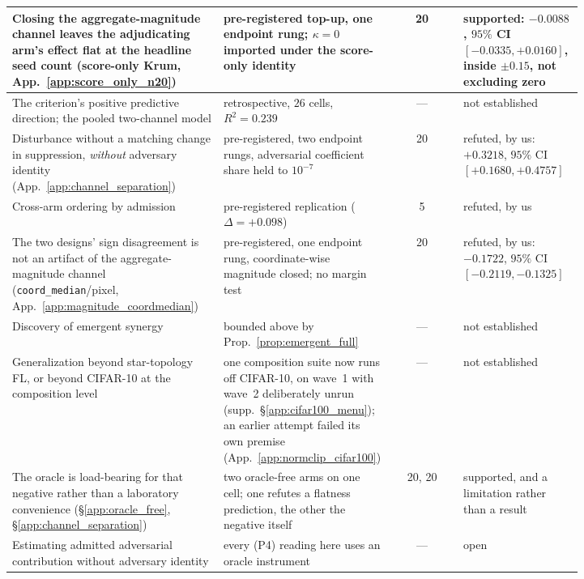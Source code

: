 \documentclass{article}
\begin{document}
\begin{table}[h]
\begin{tabular}{@{}p{0.375\linewidth}p{0.235\linewidth}cp{0.215\linewidth}@{}}
Closing the aggregate-magnitude channel leaves the adjudicating arm's effect flat at the headline seed count (score-only Krum, App.~\ref{app:score_only_n20}) & pre-registered top-up, one endpoint rung; $\kappa{=}0$ imported under the score-only identity & 20 & supported: $-0.0088$, $95\%$ CI $[-0.0335,+0.0160]$, inside $\pm0.15$, not excluding zero \\
\midrule
The criterion's positive predictive direction; the pooled two-channel model & retrospective, $26$ cells, $R^2{=}0.239$ & --- & not established \\
Disturbance without a matching change in suppression, \emph{without} adversary identity (App.~\ref{app:channel_separation}) & pre-registered, two endpoint rungs, adversarial coefficient share held to $10^{-7}$ & 20 & refuted, by us: $+0.3218$, $95\%$ CI $[+0.1680,+0.4757]$ \\
Cross-arm ordering by admission & pre-registered replication ($\Delta{=}{+}0.098$) & 5 & refuted, by us \\
The two designs' sign disagreement is not an artifact of the aggregate-magnitude channel (\texttt{coord\_median}/pixel, App.~\ref{app:magnitude_coordmedian}) & pre-registered, one endpoint rung, coordinate-wise magnitude closed; no margin test & 20 & refuted, by us: $-0.1722$, $95\%$ CI $[-0.2119,-0.1325]$ \\
Discovery of emergent synergy & bounded above by Prop.~\ref{prop:emergent_full} & --- & not established \\
Generalization beyond star-topology FL, or beyond CIFAR-10 at the composition level & one composition suite now runs off CIFAR-10, on wave~1 with wave~2 deliberately unrun (supp.\ §\ref{app:cifar100_menu}); an earlier attempt failed its own premise (App.~\ref{app:normclip_cifar100}) & --- & not established \\
The oracle is load-bearing for that negative rather than a laboratory convenience (§\ref{app:oracle_free}, §\ref{app:channel_separation}) & two oracle-free arms on one cell; one refutes a flatness prediction, the other the negative itself & 20, 20 & supported, and a limitation rather than a result \\
Estimating admitted adversarial contribution without adversary identity & every (P4) reading here uses an oracle instrument & --- & open \\
\bottomrule
\end{tabular}
\end{table}
\end{document}
